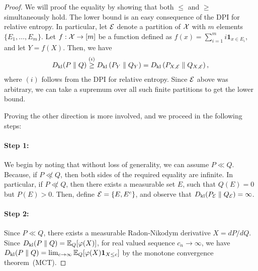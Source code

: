             \begin{proof}
                We will proof the equality by showing that both $\leq$ and $\geq$ simultaneously hold. The lower bound is an easy consequence of the DPI for relative entropy. In particular, let $\mathcal{E}$ denote a partition of $\mathcal{X}$ with $m$ elements $\{E_1, \ldots, E_m\}$. Let $f:\mathcal{X} \to [m]$ be a function defined as $f(x) = \sum_{i=1}^m i \boldsymbol{1}_{x \in E_i}$, and let $Y = f(X)$. Then, we have 
                \begin{align}
                    D_{\text{kl}}(P \parallel Q) \stackrel{(i)}{\geq} D_{\text{kl}}\left( P_Y \parallel Q_Y \right) = D_{\text{kl}} \left( P_{X, \mathcal{E}} \parallel Q_{X, \mathcal{E}} \right), 
                \end{align}
                where $(i)$ follows from the DPI for relative entropy. Since $\mathcal{E}$ above was arbitrary, we can take a supremum over all such finite partitions to get the lower bound. 

                Proving the other direction is more involved, and we proceed in the following steps: 

                \paragraph{Step 1:} We begin by noting that without loss of generality, we can assume $P \ll Q$. Because, if $P \not \ll Q$, then both sides of the required equality are infinite. In particular, if $P \not \ll Q$, then there exists a measurable set $E$, such that $Q(E)=0$ but $P(E)>0$. Then, define $\mathcal{E} = \{E, E^c\}$, and observe that $D_{\text{kl}}( P_{\mathcal{E}} \parallel Q_{\mathcal{E}}) = \infty$. 

                \paragraph{Step 2:} Since $P\ll Q$, there exists a measurable Radon-Nikodym derivative $X = dP/dQ$.  Since $D_{\text{kl}}(P \parallel Q) = \mathbb{E}_Q[\varphi(X)]$, for real valued sequence $c_n \to \infty$, we have $D_{\text{kl}}(P\parallel Q) = \lim_{c \to \infty} \mathbb{E}_Q[\varphi(X) \boldsymbol{1}_{X\leq c}]$ by the monotone convergence theorem~(MCT). 


\end{proof}
